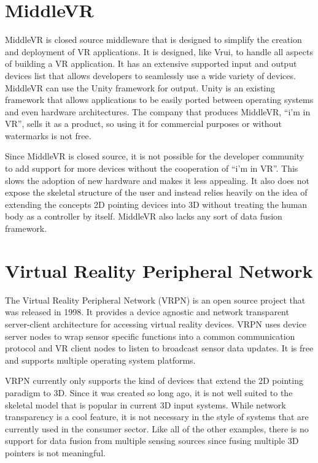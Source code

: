 \section{MiddleVR}

MiddleVR is closed source middleware that is designed to simplify the creation and deployment of VR applications. It is designed, like Vrui, to handle all aspects of building a VR application. It has an extensive supported input and output devices list that allows developers to seamlessly use a wide variety of devices. MiddleVR can use the Unity framework for output. Unity is an existing framework that allows applications to be easily ported between operating systems and even hardware architectures. The company that produces MiddleVR, “i’m in VR”, sells it as a product, so using it for commercial purposes or without watermarks is not free.

Since MiddleVR is closed source, it is not possible for the developer community to add support for more devices without the cooperation of “i’m in VR”. This slows the adoption of new hardware and makes it less appealing. It also does not expose the skeletal structure of the user and instead relies heavily on the idea of extending the concepts 2D pointing devices into 3D without treating the human body as a controller by itself. MiddleVR also lacks any sort of data fusion framework.

\section{Virtual Reality Peripheral Network}

The Virtual Reality Peripheral Network (VRPN) is an open source project that was released in 1998. It provides a device agnostic and network transparent server-client architecture for accessing virtual reality devices. VRPN uses device server nodes to wrap sensor specific functions into a common communication protocol and VR client nodes to listen to broadcast sensor data updates. It is free and supports multiple operating system platforms.

VRPN currently only supports the kind of devices that extend the 2D pointing paradigm to 3D. Since it was created so long ago, it is not well suited to the skeletal model that is popular in current 3D input systems. While network transparency is a cool feature, it is not necessary in the style of systems that are currently used in the consumer sector. Like all of the other examples, there is no support for data fusion from multiple sensing sources since fusing multiple 3D pointers is not meaningful.